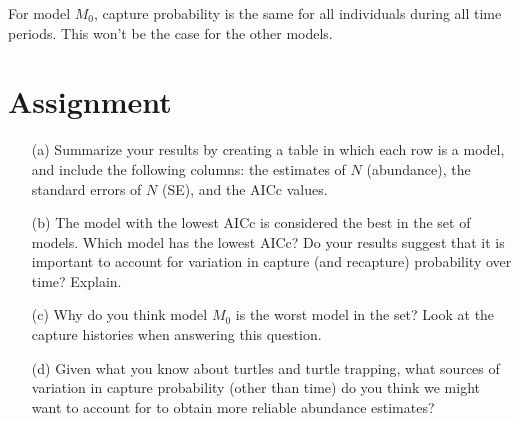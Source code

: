 \documentclass[12pt]{article}\usepackage[]{graphicx}\usepackage[]{color}
\begin{document}
For model $M_0$, capture probability is the same for all individuals
during all time periods. This won't be the case for the other models. 

\clearpage

\section*{Assignment}

\begin{enumerate}
  \item[(a)] Summarize your results by creating a table in which each row
    is a model, and include the following columns: the estimates of $N$
    (abundance), the standard errors of $N$ (SE), and the AICc
    values. 
  \item[(b)] The model with the lowest AICc is considered the best in
    the set of models. Which model has the lowest AICc? Do your
    results suggest that it is important to account for variation in
    capture (and recapture) probability over time? Explain.
  \item[(c)] Why do you think model $M_0$ is the worst model
    in the set? Look at the capture histories when answering this
    question. 
  \item[(d)] Given what you know about turtles and turtle trapping,
    what sources of variation in capture probability (other than time)
    do you think we might want to account for to obtain more reliable
    abundance estimates?
\end{enumerate}
\end{document}
